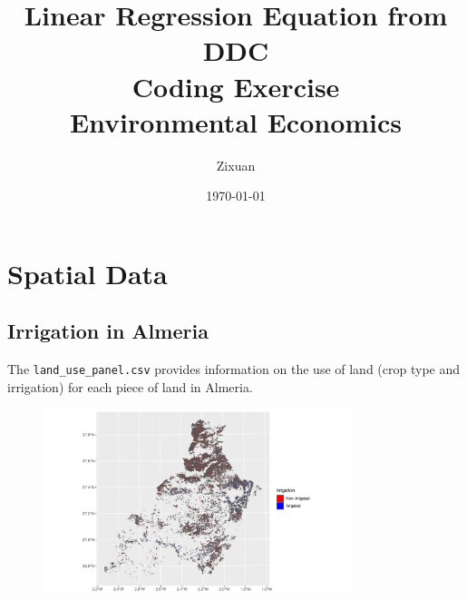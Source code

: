 \documentclass[12pt]{article}[margin=1in]
\title{\textbf{Linear Regression Equation from DDC} \\
\vspace{.3cm}
\large Coding Exercise \\
Environmental Economics}
\author{Zixuan}
\date{\today}
\begin{document}
\maketitle

\section{Spatial Data}
\subsection{Irrigation in Almeria}
The \texttt{land\_use\_panel.csv} provides information on the use of land (crop type and irrigation) for each piece of land in Almeria. 

\begin{figure}[h]
    \centering
    \includegraphics[width=0.8\textwidth]{../Figures/land_use_distribution_almeria_2021.pdf}
\end{figure}
\end{document}
